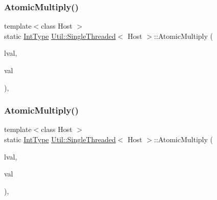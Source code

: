 \mbox{\label{classUtil_1_1SingleThreaded_a9cd0831ac28b49d1fa7bd8d24bf282bd}} 
\subsubsection{\texorpdfstring{AtomicMultiply()}{AtomicMultiply()}\hspace{0.1cm}{\footnotesize\ttfamily [1/3]}}
{\footnotesize\ttfamily template$<$class Host $>$ \\
static \mbox{\hyperlink{classUtil_1_1SingleThreaded_a35932213fb0c15a7b67ced79bc2af4c6}{Int\+Type}} \mbox{\hyperlink{classUtil_1_1SingleThreaded}{Util\+::\+Single\+Threaded}}$<$ Host $>$\+::Atomic\+Multiply (\begin{DoxyParamCaption}\item[{volatile \mbox{\hyperlink{classUtil_1_1SingleThreaded_a35932213fb0c15a7b67ced79bc2af4c6}{Int\+Type}} \&}]{lval,  }\item[{\mbox{\hyperlink{classUtil_1_1SingleThreaded_a35932213fb0c15a7b67ced79bc2af4c6}{Int\+Type}}}]{val }\end{DoxyParamCaption})\hspace{0.3cm}{\ttfamily [inline]}, {\ttfamily [static]}}

\mbox{\label{classUtil_1_1SingleThreaded_a9cd0831ac28b49d1fa7bd8d24bf282bd}} 
\subsubsection{\texorpdfstring{AtomicMultiply()}{AtomicMultiply()}\hspace{0.1cm}{\footnotesize\ttfamily [2/3]}}
{\footnotesize\ttfamily template$<$class Host $>$ \\
static \mbox{\hyperlink{classUtil_1_1SingleThreaded_a35932213fb0c15a7b67ced79bc2af4c6}{Int\+Type}} \mbox{\hyperlink{classUtil_1_1SingleThreaded}{Util\+::\+Single\+Threaded}}$<$ Host $>$\+::Atomic\+Multiply (\begin{DoxyParamCaption}\item[{volatile \mbox{\hyperlink{classUtil_1_1SingleThreaded_a35932213fb0c15a7b67ced79bc2af4c6}{Int\+Type}} \&}]{lval,  }\item[{\mbox{\hyperlink{classUtil_1_1SingleThreaded_a35932213fb0c15a7b67ced79bc2af4c6}{Int\+Type}}}]{val }\end{DoxyParamCaption})\hspace{0.3cm}{\ttfamily [inline]}, {\ttfamily [static]}}

